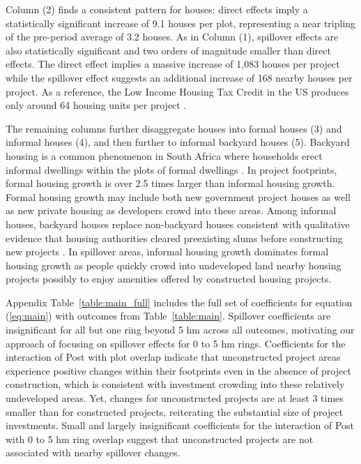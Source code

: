 \documentclass[12pt]{article}
\begin{document}
Column (2) finds a consistent pattern for houses: direct effects imply a statistically significant increase of 9.1 houses per plot, representing a near tripling of the pre-period average of 3.2 houses.  As in Column (1), spillover effects are also statistically significant and two orders of magnitude smaller than direct effects.  The direct effect implies a massive increase of 1,083 houses per project while the spillover effect suggests an additional increase of 168 nearby houses per project.  As a reference, the Low Income Housing Tax Credit in the US produces only around 64 housing units per project \citep{diamond2019wants}.

The remaining columns further disaggregate houses into formal houses (3) and informal houses (4), and then further to informal backyard houses (5).  Backyard housing is a common phenomenon in South Africa where households erect informal dwellings within the plots of formal dwellings \citep{Brueckner2018backyarding}.  In project footprints, formal housing growth is over 2.5 times larger than informal housing growth.  Formal housing growth may include both new government project houses as well as new private housing as developers crowd into these areas.  Among informal houses, backyard houses replace non-backyard houses consistent with qualitative evidence that housing authorities cleared preexisting slums before constructing new projects \citep{hofmeyr2008risk}.  In spillover areas, informal housing growth dominates formal housing growth as people quickly crowd into undeveloped land nearby housing projects possibly to enjoy amenities offered by constructed housing projects.

Appendix Table~\ref{table:main_full} includes the full set of coefficients for equation (\ref{eq:main}) with outcomes from  Table~\ref{table:main}.  Spillover coefficients are insignificant for all but one ring beyond 5 hm across all outcomes, motivating our approach of focusing on spillover effects for 0 to 5 hm rings.  Coefficients for the interaction of Post with plot overlap indicate that unconstructed project areas experience positive changes within their footprints even in the absence of project construction, which is consistent with investment crowding into these relatively undeveloped areas.  Yet, changes for unconstructed projects are at least 3 times smaller than for constructed projects, reiterating the substantial size of project investments.  Small and largely insignificant coefficients for the interaction of Post with 0 to 5 hm ring overlap suggest that unconstructed projects are not associated with nearby spillover changes.  
\end{document}
